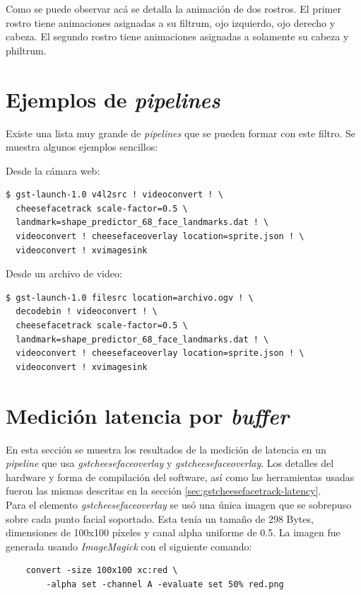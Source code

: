 \documentclass[a4paper,openright,12pt]{report}
\begin{document}
Como se puede observar acá se detalla la animación de dos rostros. El primer
rostro tiene animaciones asignadas a su filtrum, ojo izquierdo, ojo derecho y
cabeza. El segundo rostro tiene animaciones asignadas a solamente su cabeza y
philtrum.

\section{Ejemplos de \textit{pipelines}}
Existe una lista muy grande de \textit{pipelines} que se pueden formar con este
filtro. Se muestra algunos ejemplos sencillos:

Desde la cámara web:
\begin{verbatim}
$ gst-launch-1.0 v4l2src ! videoconvert ! \
  cheesefacetrack scale-factor=0.5 \
  landmark=shape_predictor_68_face_landmarks.dat ! \
  videoconvert ! cheesefaceoverlay location=sprite.json ! \
  videoconvert ! xvimagesink
\end{verbatim}

Desde un archivo de video:
\begin{verbatim}
$ gst-launch-1.0 filesrc location=archivo.ogv ! \
  decodebin ! videoconvert ! \
  cheesefacetrack scale-factor=0.5 \
  landmark=shape_predictor_68_face_landmarks.dat ! \
  videoconvert ! cheesefaceoverlay location=sprite.json ! \
  videoconvert ! xvimagesink
\end{verbatim}

\section{Medición latencia por \textit{buffer}}
En esta sección se muestra los resultados de la medición de latencia en un
\textit{pipeline} que usa \textit{gstcheesefaceoverlay} y
\textit{gstcheesefaceoverlay}. Los detalles del hardware y forma de compilación
del software, así como las herramientas usadas fueron las mismas descritas en
la sección \ref{sec:gstcheesefacetrack-latency}.\\

Para el elemento \textit{gstcheesefaceoverlay} se usó una única imagen
que se sobrepuso sobre cada punto facial soportado. Esta tenía un tamaño de
298 Bytes, dimensiones de 100x100 píxeles y canal alpha uniforme de 0.5. La
imagen fue generada usando \textit{ImageMagick} con el siguiente comando:

  \begin{verbatim}
    convert -size 100x100 xc:red \
        -alpha set -channel A -evaluate set 50% red.png
  \end{verbatim}
\end{document}
